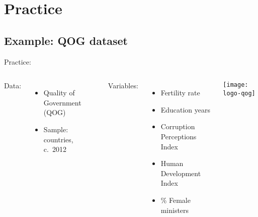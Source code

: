 \documentclass[t]{beamer}
\begin{document}
	\section{Practice}

	\subsection{Example: QOG dataset}
	
	\begin{frame}[t]{Practice: }

		\begin{columns}[c]

	    Data:\\[.5em]

			\begin{itemize}
				\item Quality of Government (QOG)
				\item Sample: countries, c.~2012
			\end{itemize}
		
			\vspace{.75em}
		
	    Variables:\\[.5em]
		
			\begin{itemize}
				\item Fertility rate
				\item Education years
				\item Corruption Perceptions Index
				\item Human Development Index
				\item \% Female ministers
			\end{itemize}
	

			\texttt{[image: logo-qog]}

		\end{columns}
	
	\end{frame}
\end{document}
